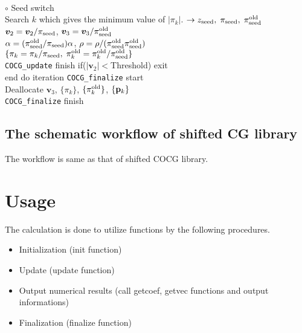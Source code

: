 \documentclass[12pt,titlepage]{article}
\renewenvironment{leftbar}{%
  \def\FrameCommand{\vrule width 1pt \hspace{0pt}}%
  \MakeFramed {\advance\hsize-\width \FrameRestore}}%
 {\endMakeFramed}
\begin{document}
\begin{leftbar}
  \\\hspace{1.0cm}
  $\circ$ Seed switch
  \\\hspace{1.0cm}
  Search $k$ which gives the minimum value of $|\pi_k|$.
  $\rightarrow z_{\rm seed},\; \pi_{\rm seed},\; \pi_{\rm seed}^{\rm old} $
  \\\hspace{1.0cm}
  ${\boldsymbol v}_2 = {\boldsymbol v}_2 / \pi_{\rm seed}$,
  ${\boldsymbol v}_3 = {\boldsymbol v}_3 / \pi_{\rm seed}^{\rm old}$
  \\\hspace{1.0cm}
  $\alpha = (\pi_{\rm seed}^{\rm old} / \pi_{\rm seed}) \alpha$,
  $\rho = \rho / (\pi_{\rm seed}^{\rm old} \pi_{\rm seed}^{\rm old})$
  \\\hspace{1.0cm}
  $\{\pi_k = \pi_k / \pi_{\rm seed},\; \pi_k^{\rm old} = \pi_k^{\rm old} / \pi_{\rm seed}^{\rm old}\}$
  \\\hspace{0.5cm}
  \verb|COCG_update| finish
\end{leftbar}
\vspace{-1em}
\noindent
\hspace{0.5cm}
if($|{\boldsymbol v}_2| < $Threshold) exit
\\
end do iteration
\vspace{-1em}
\begin{leftbar}
  \noindent
  \verb|COCG_finalize| start
  \\ \hspace{0.5cm}
  Deallocate ${\boldsymbol v}_3$, $\{\pi_k\}$, $\{\pi_k^{\rm old}\}$, $\{{\bf p}_k\}$
  \\
  \verb|COCG_finalize| finish
\end{leftbar}
\vspace{-1em}

\subsection{The schematic workflow of shifted CG library}

The workflow is same as that of shifted COCG library.

\section{Usage}

The calculation is done to utilize functions by the following procedures.
\begin{itemize}
\item Initialization (init function)
\item Update (update function)
\item Output numerical results (call getcoef, getvec functions and output informations)
\item Finalization (finalize function)
\end{itemize}
\end{document}
